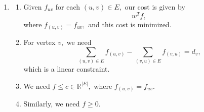 \documentclass[12pt]{article}
\begin{document}
\begin{enumerate}
\begin{enumerate}
      \item Take a linear combination of the second and fourth
        constraint, with coefficients $3/2$ and $1/2,$ yielding $(3,
        2) x \geq 30,$ meaning the objective has lower-bound $30.$
    \end{enumerate}

  \item
    \begin{enumerate}
      \item Given $f_{uv}$ for each $(u, v) \in E,$ our cost is given by
        $$
        w^T f,
        $$
        where $f_{(u, v)}= f_{uv},$ and this cost is minimized.

      \item For vertex $v,$ we need
        $$
        \sum_{(u, v) \in E} f_{(u, v)} - \sum_{(v, u) \in E} f_{(v, u)} = d_{v},
        $$
        which is a linear constraint.

      \item We need $f \leq c \in \mathbb R^{|E|},$ where $f_{(u, v)} = f_{uv}.$

      \item Similarly, we need $f \geq 0.$
    \end{enumerate}
\end{enumerate}
\end{document}
